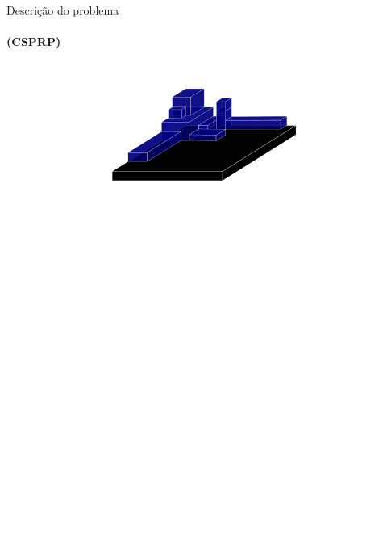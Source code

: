 \documentclass[12pt]{beamer}
\begin{document}
\begin{frame}{Descri\c{c}\~ao do problema}
	\framesubtitle{(CSPRP)}
\fboxsep=0pt
%
\hfill%
{%
	\begin{minipage}[t]{0.48\linewidth}
		\begin{figure}			
			\includegraphics[width=1\linewidth]{volume_caixas}
		\end{figure}
		

	\end{minipage}
}
\end{frame}
\end{document}
